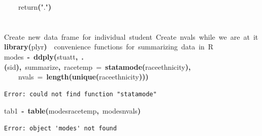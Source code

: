 \documentclass[12pt]{article}
\makeatletter
\newcommand{\hlfunctioncall}[1]{\textcolor[rgb]{0.501960784313725,0,0.329411764705882}{\textbf{#1}}}%
\newcommand{\hlstring}[1]{\textcolor[rgb]{0.6,0.6,1}{#1}}%
\newcommand{\hlkeyword}[1]{\textcolor[rgb]{0,0,0}{\textbf{#1}}}%
\newcommand{\hlargument}[1]{\textcolor[rgb]{0.690196078431373,0.250980392156863,0.0196078431372549}{#1}}%
\newcommand{\hlcomment}[1]{\textcolor[rgb]{0.180392156862745,0.6,0.341176470588235}{#1}}%
\newcommand{\hlassignement}[1]{\textcolor[rgb]{0,0,0}{\textbf{#1}}}%
\newcommand{\hlsymbol}[1]{\textcolor[rgb]{0,0,0}{#1}}%
\newcommand{\hlstd}[1]{\textcolor[rgb]{0,0,0}{#1}}%
\newenvironment{kframe}{%
 \def\FrameCommand##1{\hskip\@totalleftmargin \hskip-\fboxsep
 \colorbox{shadecolor}{##1}\hskip-\fboxsep
     \hskip-\linewidth \hskip-\@totalleftmargin \hskip\columnwidth}%
 \MakeFramed {\advance\hsize-\width
   \@totalleftmargin\z@ \linewidth\hsize
   \@setminipage}}%
 {\par\unskip\endMakeFramed}
\newenvironment{knitrout}{}{} %
\renewenvironment{knitrout}{\begin{footnotesize}}{\end{footnotesize}}
\makeatother
\begin{document}
\begin{knitrout}
\begin{kframe}
\begin{flushleft}
\hlstd{}{\ }{\ }{\ }{\ }\hlsymbol{return}\hlfunctioncall{}\hlkeyword{(}\hlstring{"{}."{}}\hlkeyword{)}\hspace*{\fill}\\
\hlstd{}\hlkeyword{\usebox{\hlnormalsizeboxclosebrace}}\hspace*{\fill}\\
\hlstd{}\hspace*{\fill}\\
\hlstd{}\hlcomment{\usebox{\hlnormalsizeboxhash}{\ }Create{\ }new{\ }data{\ }frame{\ }for{\ }individual{\ }student{\ }Create{\ }nvals{\ }while{\ }we{\ }are{\ }at{\ }it}\hspace*{\fill}\\
\hlstd{}\hlfunctioncall{library}\hlkeyword{(}\hlsymbol{plyr}\hlkeyword{)}{\ }{\ }\hlcomment{\usebox{\hlnormalsizeboxhash}{\ }convenience{\ }functions{\ }for{\ }summarizing{\ }data{\ }in{\ }R}\hspace*{\fill}\\
\hlstd{}\hlsymbol{modes}{\ }\hlassignement{\usebox{\hlnormalsizeboxlessthan}-}{\ }\hlfunctioncall{ddply}\hlkeyword{(}\hlsymbol{stuatt}\hlkeyword{,}{\ }\hlfunctioncall{.}\hlkeyword{(}\hlsymbol{sid}\hlkeyword{)}\hlkeyword{,}{\ }\hlsymbol{summarize}\hlkeyword{,}{\ }\hlargument{race\usebox{\hlnormalsizeboxunderscore}temp}{\ }\hlargument{=}{\ }\hlfunctioncall{statamode}\hlkeyword{(}\hlsymbol{race\usebox{\hlnormalsizeboxunderscore}ethnicity}\hlkeyword{)}\hlkeyword{,}\hspace*{\fill}\\
\hlstd{}{\ }{\ }{\ }{\ }\hlargument{nvals}{\ }\hlargument{=}{\ }\hlfunctioncall{length}\hlkeyword{(}\hlfunctioncall{unique}\hlkeyword{(}\hlsymbol{race\usebox{\hlnormalsizeboxunderscore}ethnicity}\hlkeyword{)}\hlkeyword{)}\hlkeyword{)}\mbox{}
\normalfont
\end{flushleft}
\begin{verbatim}
Error: could not find function "statamode"
\end{verbatim}
\begin{flushleft}
\ttfamily\noindent
\hlsymbol{tab1}{\ }\hlassignement{\usebox{\hlnormalsizeboxlessthan}-}{\ }\hlfunctioncall{table}\hlkeyword{(}\hlsymbol{modes}\hlkeyword{\usebox{\hlnormalsizeboxdollar}}\hlsymbol{race\usebox{\hlnormalsizeboxunderscore}temp}\hlkeyword{,}{\ }\hlsymbol{modes}\hlkeyword{\usebox{\hlnormalsizeboxdollar}}\hlsymbol{nvals}\hlkeyword{)}\mbox{}
\normalfont
\end{flushleft}
\begin{verbatim}
Error: object 'modes' not found

\end{verbatim}
\end{kframe}
\end{knitrout}
\end{document}
